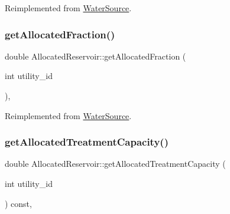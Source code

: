 Reimplemented from \mbox{\hyperlink{classWaterSource_a44102a0eafdaebd86f0ed8dabb313733_a44102a0eafdaebd86f0ed8dabb313733}{Water\+Source}}.

\mbox{\label{classAllocatedReservoir_a731381982c9245b0bf24db4082dc74c1_a731381982c9245b0bf24db4082dc74c1}} 
\subsubsection{\texorpdfstring{get\+Allocated\+Fraction()}{getAllocatedFraction()}}
{\footnotesize\ttfamily double Allocated\+Reservoir\+::get\+Allocated\+Fraction (\begin{DoxyParamCaption}\item[{int}]{utility\+\_\+id }\end{DoxyParamCaption})\hspace{0.3cm}{\ttfamily [override]}, {\ttfamily [virtual]}}



Reimplemented from \mbox{\hyperlink{classWaterSource_a1843ada21b8e7500d80a5a7db10621b3_a1843ada21b8e7500d80a5a7db10621b3}{Water\+Source}}.

\mbox{\label{classAllocatedReservoir_aba81b93e1aa1154ce411248903fabde6_aba81b93e1aa1154ce411248903fabde6}} 
\subsubsection{\texorpdfstring{get\+Allocated\+Treatment\+Capacity()}{getAllocatedTreatmentCapacity()}}
{\footnotesize\ttfamily double Allocated\+Reservoir\+::get\+Allocated\+Treatment\+Capacity (\begin{DoxyParamCaption}\item[{int}]{utility\+\_\+id }\end{DoxyParamCaption}) const\hspace{0.3cm}{\ttfamily [override]}, {\ttfamily [virtual]}}



